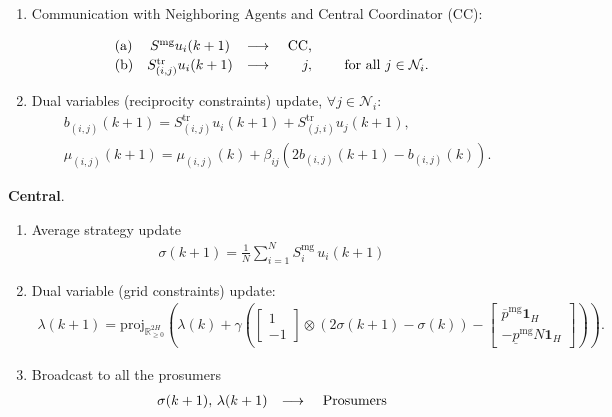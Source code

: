 \documentclass[10pt]{article}
\newcommand{\mc}{\mathcal}
\newcommand{\bb}{\mathbb}
\newcommand{\R}{\bb R}
\newcommand{\proj}{\mathrm{proj}}
\newcommand{\0}{\mathbf{0}}
\newcommand{\1}{\mathbf{1}}
\begin{document}
\begin{algorithm}[H]
\begin{enumerate}[(1)]
\medskip
\item Communication with Neighboring Agents and Central Coordinator (CC):

	\begin{align*}	
	\begin{array}{l c c r c}
	\text{(a)} &  S^{\textrm{mg}} u_{i}(k+1) &
	\longrightarrow & \text{ CC,} & \\[.2em]
	\text{(b)} & S^{\textrm{tr}}_{(i,j)} u_{i}(k+1) &
	\longrightarrow & j, & \quad \text{ for all } j \in \mc N_i. 
	\end{array}
	\end{align*}

\item Dual variables (reciprocity constraints) update, $\forall j \in \mc N_i$:
	\vspace*{-.5em}
	\begin{align*}
&	b_{(i,j)}(k+1)  =  S^{\textrm{tr}}_{(i,j)} u_{i}(k+1) + S^{\textrm{tr}}_{(j,i)}  u_{j}(k+1), \\
%
&	\mu_{(i,j)}(k+1) = \mu_{(i,j)}(k) + \beta_{ij} \left( 
	2  b_{(i,j)}(k+1) - b_{(i,j)}(k)
	\right).
	\end{align*}
\end{enumerate}

\bigskip
\textbf{Central}.	
	\begin{enumerate}[(1)]
	\item Average strategy update
	 \begin{align*}
	 \sigma(k+1) = \frac{1}{N} \sum_{i=1}^N S_i^{\text{mg}} \, u_i(k+1)
	 \end{align*}	

	\smallskip	
	\item Dual variable (grid constraints) update:
	\vspace*{-.5em}
	\begin{align*}
	\lambda(k+1) = \textstyle
	\proj_{\R^{2 H}_{\geq 0}}\left( 
	\lambda(k) + \gamma \left( 
	\left[
	\begin{smallmatrix}
	1\\
	- 1 
	\end{smallmatrix}
	\right] \otimes (2 \sigma(k+1)- \sigma(k)) 
	-
	\left[
	\begin{smallmatrix}
	\overline{p}^{\mathrm{mg}}\1_{H} \\
	-     \underline{p}^{\mathrm{mg}}N \1_{H}
	\end{smallmatrix} 
	\right]  
	\right)
	\right).
	\end{align*}
	 
	 
	 \smallskip
	 \item Broadcast to all the prosumers
	 	\begin{align*}
	\begin{array}{l c c c }
\sigma(k+1), \, \lambda(k+1) &
	\longrightarrow & \text{ Prosumers} 
	\end{array}
	\end{align*}
	\end{enumerate}
	
\end{algorithm}
\end{document}
